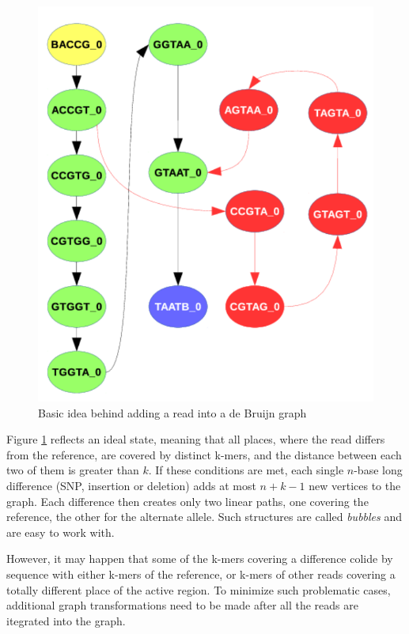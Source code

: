 \begin{figure}[h]
	\centering
	\includegraphics{img/read-idea.pdf}
	\caption{Basic idea behind adding a read into a de Bruijn graph}
	\label{fig:read-idea}
\end{figure}

Figure \ref{fig:read-idea} reflects an ideal state, meaning that all places, where the read differs from the reference, are covered by distinct k-mers, and the distance between each two of them is greater than $k$. If these conditions are met, each single $n$-base long difference (SNP, insertion or deletion) adds at most $n+k-1$ new vertices to the graph. Each difference then creates only two linear paths, one covering the reference, the other for the alternate allele. Such structures are called \textit{bubbles} and are easy to work with.

However, it may happen that some of the k-mers covering a difference colide by sequence with either k-mers of the reference, or k-mers of other reads covering a totally different place of the active region. To minimize such problematic cases, additional graph transformations need to be made after all the reads are itegrated into the graph.

